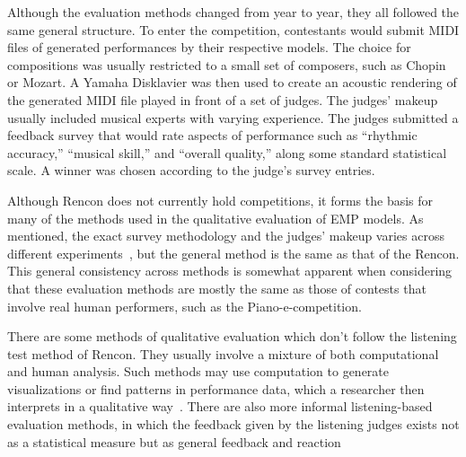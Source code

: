 Although the evaluation methods changed from year to year, they all followed the same general structure. To enter the competition, contestants would submit MIDI files of generated performances by their respective models. The choice for compositions was usually restricted to a small set of composers, such as Chopin or Mozart. A Yamaha Disklavier was then used to create an acoustic rendering of the generated MIDI file played in front of a set of judges. The judges' makeup usually included musical experts with varying experience. The judges submitted a feedback survey that would rate aspects of performance such as ``rhythmic accuracy,'' ``musical skill,'' and ``overall quality,'' along some standard statistical scale. A winner was chosen according to the judge's survey entries. 

Although Rencon does not currently hold competitions, it forms the basis for many of the methods used in the qualitative evaluation of EMP models. As mentioned, the exact survey methodology and the judges' makeup varies across different experiments~\cite{jeong2019virtuosonet, schubert2017algorithms}, but the general method is the same as that of the Rencon. This general consistency across methods is somewhat apparent when considering that these evaluation methods are mostly the same as those of contests that involve real human performers, such as the Piano-e-competition. 

There are some methods of qualitative evaluation which don't follow the listening test method of Rencon. They usually involve a mixture of both computational and human analysis. Such methods may use computation to generate visualizations or find patterns in performance data, which a researcher then interprets in a qualitative way~\cite{widmer2009yqx,jeong2019score, grachten2012linear}. There are also more informal listening-based evaluation methods, in which the feedback given by the listening judges exists not as a statistical measure but as general feedback and reaction~\cite{oore2020time}

